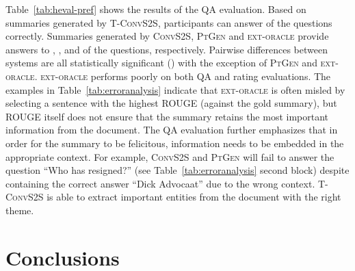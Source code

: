 \documentclass[11pt,a4paper]{article}
\begin{document}
 


Table~\ref{tab:heval-pref} shows the results of the QA
evaluation. Based on summaries generated by \mbox{\textsc{T-ConvS2S}},
participants can answer  of the questions
correctly. Summaries generated by \textsc{ConvS2S}, \textsc{PtGen} and
\textsc{ext-oracle} provide answers to , , and
 of the questions, respectively. Pairwise differences between
systems are all statistically significant () with the
exception of \textsc{PtGen} and \textsc{ext-oracle}.
\textsc{ext-oracle} performs poorly on both QA and rating
evaluations. The examples in Table~\ref{tab:erroranalysis} indicate
that \textsc{ext-oracle} is often misled by selecting a sentence with
the highest ROUGE (against the gold summary), but ROUGE itself does
not ensure that the summary retains the most important information
from the document.  The QA evaluation further emphasizes that in order
for the summary to be felicitous, information needs to be embedded in
the appropriate context. For example, \textsc{ConvS2S} and
\textsc{PtGen} will fail to answer the question ``Who has resigned?''
(see Table~\ref{tab:erroranalysis} second block) despite containing
the correct answer ``Dick Advocaat'' due to the wrong
context. \mbox{\textsc{T-ConvS2S}} is able to extract
important entities from the document with the right theme.


















































 



\section{Conclusions}
\end{document}

